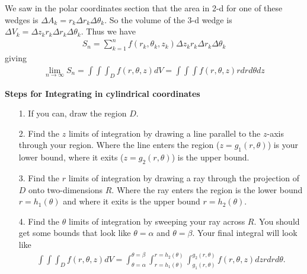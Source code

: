 \documentclass[12pt, letter]{article}
\theoremstyle{plain}
\numberwithin{theorem}{section}
\theoremstyle{definition}
\begin{document}
\bigskip

We saw in the polar coordinates section that the area in 2-d for one of these wedges is $\Delta A_k = r_k \Delta r_k \Delta \theta_k$. So the volume of the 3-d wedge is $\Delta V_k = \Delta z_k r_k \Delta r_k \Delta \theta_k$. Thus we have
\begin{align*}
S_n = \sum_{k=1}^n f(r_k,\theta_k, z_k) \Delta z_k r_k \Delta r_k \Delta \theta_k
\end{align*}
giving
\begin{align*}
\lim_{n\to\infty} S_n = \int\int\int_D f(r,\theta,z) dV = \int\int\int f(r,\theta,z) rdrd\theta dz
\end{align*}

\bigskip

\hrulefill

\bigskip

\textbf{Steps for Integrating in cylindrical coordinates}
\begin{itemize}
\item[1.] If you can, draw the region $D$.
\item[2.] Find the $z$ limits of integration by drawing a line parallel to the $z$-axis through your region. Where the line enters the region ($z=g_1(r,\theta)$) is your lower bound, where it exits ($z=g_2(r,\theta)$) is the upper bound.
\item[3.] Find the $r$ limits of integration by drawing a ray through the projection of $D$ onto two-dimensions $R$. Where the ray enters the region is the lower bound $r=h_1(\theta)$ and where it exits is the upper bound $r=h_2(\theta)$.
\item[4.] Find the $\theta$ limits of integration by sweeping your ray across $R$. You should get some bounds that look like $\theta=\alpha$ and $\theta=\beta$. Your final integral will look like
\begin{align*}
\int\int\int_D f(r,\theta,z) dV = \int_{\theta=\alpha}^{\theta=\beta} \int_{r=h_1(\theta)}^{r=h_2(\theta)} \int_{g_1(r,\theta)}^{g_2(r,\theta)} f(r,\theta,z) dz r dr d\theta.
\end{align*}
\end{itemize}

\bigskip

\hrulefill

\bigskip
\end{document}
